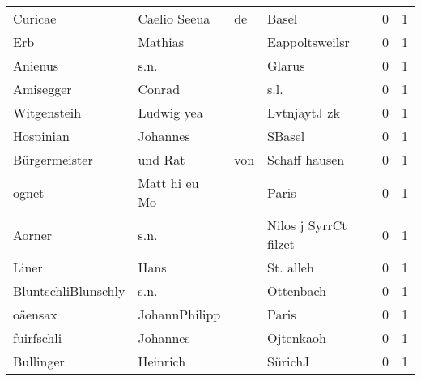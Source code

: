 \begin{center}
\begin{tiny}
\begin{longtabu}{llllrr}
                  Curicae &                       Caelio Seeua &          de &                                       Basel &          0 &         1 \\
                      Erb &                            Mathias &             &                              Eappoltsweilsr &          0 &         1 \\
                  Anienus &                               s.n. &             &                                      Glarus &          0 &         1 \\
                Amisegger &                             Conrad &             &                                        s.l. &          0 &         1 \\
              Witgensteih &                         Ludwig yea &             &                                LvtnjaytJ zk &          0 &         1 \\
                Hospinian &                           Johannes &             &                                      SBasel &          0 &         1 \\
            Bürgermeister &                            und Rat &         von &                               Schaff hausen &          0 &         1 \\
                    ognet &                      Matt hi eu Mo &             &                                       Paris &          0 &         1 \\
                   Aorner &                               s.n. &             &                       Nilos j SyrrCt filzet &          0 &         1 \\
                    Liner &                               Hans &             &                                   St. alleh &          0 &         1 \\
      BluntschliBlunschly &                               s.n. &             &                                   Ottenbach &          0 &         1 \\
                  oäensax &                      JohannPhilipp &             &                                       Paris &          0 &         1 \\
               fuirfschli &                           Johannes &             &                                   Ojtenkaoh &          0 &         1 \\
                Bullinger &                           Heinrich &             &                                     SürichJ &          0 &         1 \\

\end{longtabu}
\end{tiny}
\end{center}

